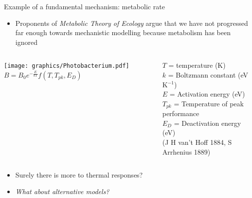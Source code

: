 \documentclass[xcolor=x11names,compress]{beamer}
\renewcommand{\(}{\begin{columns}}
\renewcommand{\)}{\end{columns}}
\newcommand{\<}[1]{\begin{column}{#1}}
\renewcommand{\>}{\end{column}}
\begin{document}
\begin{frame}{Example of a fundamental mechanism: metabolic rate}

	\begin{itemize}
		\item Proponents of {\it Metabolic Theory of Ecology} argue that we have not progressed far enough towards mechanistic modelling because metabolism has been ignored
	\end{itemize}

	\begin{columns}[c]
    \pause
      \texttt{[image: graphics/Photobacterium.pdf]}
  \pause
  \scriptsize
    $B = B_0 \boxed {e^{-\frac{E}{kT}}}f(T,T_{pk},E_D)$\\
    \vspace{10pt}
    \raggedright{$T$ = temperature (K)\\
     $k$ = Boltzmann constant (eV K$^{-1}$)}\\
     $E$ = Activation energy (eV)\\
     $T_{pk}$ = Temperature of peak performance\\
	 $E_D$ = Deactivation energy (eV)\\
	 
    {\tiny (J H van't Hoff 1884, S Arrhenius 1889)}
\end{columns}

\begin{itemize}\setlength{\itemindent}{0em}
  \pause
  \item Surely there is more to thermal responses?
  \item \textit{What about alternative models?}\\

\end{itemize}
 
\end{frame}
\end{document}
